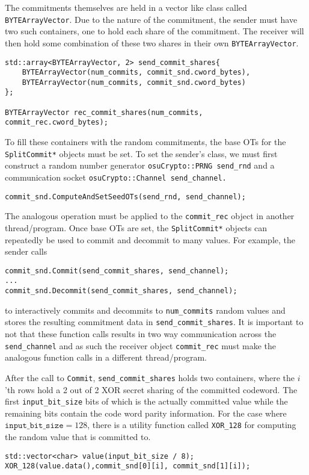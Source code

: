 The commitments themselves are held in a vector like class called \texttt{BYTEArrayVector}. Due to the nature of the commitment, the sender must have two such containers, one to hold each share of the commitment. The receiver will then hold some combination of these two shares in their own \texttt{BYTEArrayVector}.
\begin{lstlisting}
std::array<BYTEArrayVector, 2> send_commit_shares{
	BYTEArrayVector(num_commits, commit_snd.cword_bytes),
	BYTEArrayVector(num_commits, commit_snd.cword_bytes)
};

BYTEArrayVector rec_commit_shares(num_commits, commit_rec.cword_bytes);
\end{lstlisting}
To fill these containers with the random commitments, the base OTs for the \texttt{SplitCommit*} objects must be set. To set the sender's class, we must first construct a random number generator \texttt{osuCrypto::PRNG send\_rnd} and a communication socket \texttt{osuCrypto::Channel send\_channel.} 
\begin{lstlisting}
commit_snd.ComputeAndSetSeedOTs(send_rnd, send_channel);
\end{lstlisting}
The analogous operation must be applied to the \texttt{commit\_rec} object in another thread/program. Once base OTs are set, the \texttt{SplitCommit*} objects can repeatedly be used to commit and decommit to many values. For example, the sender calls
\begin{lstlisting}     
commit_snd.Commit(send_commit_shares, send_channel);
...
commit_snd.Decommit(send_commit_shares, send_channel);
\end{lstlisting}
to interactively commits and decommits to \texttt{num\_commits} random values and stores the resulting commitment data in \texttt{send\_commi\allowbreak t\_shares}. It is important to not that these function calls results in two way communication across the  \texttt{send\_channel} and as such the receiver object \texttt{commit\_rec} must make the analogous function calls in a different thread/program. 

After the call to \texttt{Commit}, \texttt{send\_commit\_shares} holds two containers, where the $i$'th rows hold a 2 out of 2 XOR secret sharing of the committed codeword. The first \texttt{input\_bit\_size} bits of which is the actually committed value while the remaining bits contain the code word parity information. For the case where $\texttt{input\_bit\_size} =128$, there is a utility function called \texttt{XOR\_128} for computing the random value that is committed to.
\begin{lstlisting}     
std::vector<char> value(input_bit_size / 8);
XOR_128(value.data(),commit_snd[0][i], commit_snd[1][i]);
\end{lstlisting}

